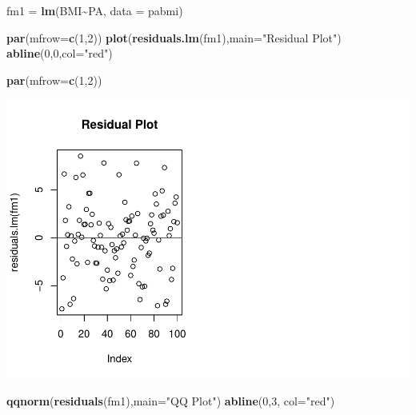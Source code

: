 \documentclass[
]{article}
\newenvironment{Shaded}{\begin{snugshade}}{\end{snugshade}}
\newcommand{\AttributeTok}[1]{\textcolor[rgb]{0.13,0.29,0.53}{#1}}
\newcommand{\DecValTok}[1]{\textcolor[rgb]{0.00,0.00,0.81}{#1}}
\newcommand{\FunctionTok}[1]{\textcolor[rgb]{0.13,0.29,0.53}{\textbf{#1}}}
\newcommand{\NormalTok}[1]{#1}
\newcommand{\OtherTok}[1]{\textcolor[rgb]{0.56,0.35,0.01}{#1}}
\newcommand{\SpecialCharTok}[1]{\textcolor[rgb]{0.81,0.36,0.00}{\textbf{#1}}}
\newcommand{\StringTok}[1]{\textcolor[rgb]{0.31,0.60,0.02}{#1}}
\begin{document}
\begin{Shaded}
\begin{Highlighting}[]
\NormalTok{fm1 }\OtherTok{=} \FunctionTok{lm}\NormalTok{(BMI}\SpecialCharTok{\textasciitilde{}}\NormalTok{PA, }\AttributeTok{data =}\NormalTok{ pabmi)}

\FunctionTok{par}\NormalTok{(}\AttributeTok{mfrow=}\FunctionTok{c}\NormalTok{(}\DecValTok{1}\NormalTok{,}\DecValTok{2}\NormalTok{))}
\FunctionTok{plot}\NormalTok{(}\FunctionTok{residuals.lm}\NormalTok{(fm1),}\AttributeTok{main=}\StringTok{"Residual Plot"}\NormalTok{)}
\FunctionTok{abline}\NormalTok{(}\DecValTok{0}\NormalTok{,}\DecValTok{0}\NormalTok{,}\AttributeTok{col=}\StringTok{"red"}\NormalTok{)}

\FunctionTok{par}\NormalTok{(}\AttributeTok{mfrow=}\FunctionTok{c}\NormalTok{(}\DecValTok{1}\NormalTok{,}\DecValTok{2}\NormalTok{))}
\end{Highlighting}
\end{Shaded}

\includegraphics{MA_331_Final_-_Amane_and_Harry--2-_files/figure-latex/unnamed-chunk-2-1.pdf}

\begin{Shaded}
\begin{Highlighting}[]
\FunctionTok{qqnorm}\NormalTok{(}\FunctionTok{residuals}\NormalTok{(fm1),}\AttributeTok{main=}\StringTok{"QQ Plot"}\NormalTok{)}
\FunctionTok{abline}\NormalTok{(}\DecValTok{0}\NormalTok{,}\DecValTok{3}\NormalTok{, }\AttributeTok{col=}\StringTok{"red"}\NormalTok{)}
\end{Highlighting}
\end{Shaded}
\end{document}
